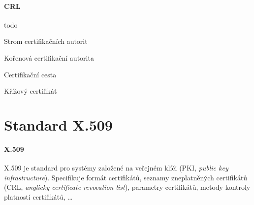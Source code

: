 \paragraph*{CRL} todo

Strom certifikačních autorit

Kořenová certifikační autorita

Certifikační cesta

Křížový certifikát



\section{Standard X.509}

\paragraph*{X.509} X.509 je standard pro systémy založené na veřejném klíči (PKI, \textit{public key infrastructure}). Specifikuje formát certifikátů, seznamy zneplatněných certifikátů (CRL, \textit{anglicky certificate revocation list}), parametry certifikátů, metody kontroly platností certifikátů, \dots

